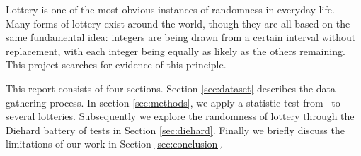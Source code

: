 Lottery is one of the most obvious instances of randomness in everyday life. Many forms of lottery exist around the world,
though they are all based on the same fundamental idea: integers are being drawn from a certain interval without replacement,
with each integer being equally as likely as the others remaining. This project searches for evidence of this principle.

This report consists of four sections. Section \ref{sec:dataset} describes the data gathering process. In section \ref{sec:methods},
we apply a statistic test from~\cite{Drakakis} to several lotteries. Subsequently we explore the randomness of lottery through
the Diehard battery of tests in Section \ref{sec:diehard}. Finally we briefly discuss the limitations of our work in Section \ref{sec:conclusion}.

